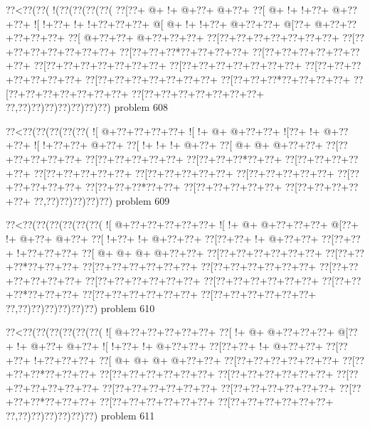 \vbox{\vbox{\goo
\0??<\0??(\0??(\- !(\0??(\0??(\0??(\0??(
\0??[\0??+\- @+\- !+\- @+\0??+\- @+\0??+
\0??[\- @+\- !+\- !+\0??+\- @+\0??+\0??+
\- ![\- !+\0??+\- !+\- !+\0??+\0??+\0??+
\- @[\- @+\- !+\- !+\0??+\- @+\0??+\0??+
\- @[\0??+\- @+\0??+\0??+\0??+\0??+\0??+
\0??[\- @+\0??+\0??+\- @+\0??+\0??+\0??+
\0??[\0??+\0??+\0??+\0??+\0??+\0??+\0??+
\0??[\0??+\0??+\0??+\0??+\0??+\0??+\0??+
\0??[\0??+\0??+\0??*\0??+\0??+\0??+\0??+
\0??[\0??+\0??+\0??+\0??+\0??+\0??+\0??+
\0??[\0??+\0??+\0??+\0??+\0??+\0??+\0??+
\0??[\0??+\0??+\0??+\0??+\0??+\0??+\0??+
\0??[\0??+\0??+\0??+\0??+\0??+\0??+\0??+
\0??[\0??+\0??+\0??+\0??+\0??+\0??+\0??+
\0??[\0??+\0??+\0??*\0??+\0??+\0??+\0??+
\0??[\0??+\0??+\0??+\0??+\0??+\0??+\0??+
\0??[\0??+\0??+\0??+\0??+\0??+\0??+\0??+
\0??,\0??)\0??)\0??)\0??)\0??)\0??)\0??)
}
\hfil problem 608\hfil\break
}

\vbox{\vbox{\goo
\0??<\0??(\0??(\0??(\0??(\0??(
\- ![\- @+\0??+\0??+\0??+\0??+
\- ![\- !+\- @+\- @+\0??+\0??+
\- ![\0??+\- !+\- @+\0??+\0??+
\- ![\- !+\0??+\0??+\- @+\0??+
\0??[\- !+\- !+\- !+\- @+\0??+
\0??[\- @+\- @+\- @+\0??+\0??+
\0??[\0??+\0??+\0??+\0??+\0??+
\0??[\0??+\0??+\0??+\0??+\0??+
\0??[\0??+\0??+\0??*\0??+\0??+
\0??[\0??+\0??+\0??+\0??+\0??+
\0??[\0??+\0??+\0??+\0??+\0??+
\0??[\0??+\0??+\0??+\0??+\0??+
\0??[\0??+\0??+\0??+\0??+\0??+
\0??[\0??+\0??+\0??+\0??+\0??+
\0??[\0??+\0??+\0??*\0??+\0??+
\0??[\0??+\0??+\0??+\0??+\0??+
\0??[\0??+\0??+\0??+\0??+\0??+
\0??,\0??)\0??)\0??)\0??)\0??)
}
\hfil problem 609\hfil\break
}

\vbox{\vbox{\goo
\0??<\0??(\0??(\0??(\0??(\0??(\0??(
\- ![\- @+\0??+\0??+\0??+\0??+\0??+
\- ![\- !+\- @+\- @+\0??+\0??+\0??+
\- @[\0??+\- !+\- @+\0??+\- @+\0??+
\0??[\- !+\0??+\- !+\- @+\0??+\0??+
\0??[\0??+\0??+\- !+\- @+\0??+\0??+
\0??[\0??+\0??+\- !+\0??+\0??+\0??+
\0??[\- @+\- @+\- @+\- @+\0??+\0??+
\0??[\0??+\0??+\0??+\0??+\0??+\0??+
\0??[\0??+\0??+\0??*\0??+\0??+\0??+
\0??[\0??+\0??+\0??+\0??+\0??+\0??+
\0??[\0??+\0??+\0??+\0??+\0??+\0??+
\0??[\0??+\0??+\0??+\0??+\0??+\0??+
\0??[\0??+\0??+\0??+\0??+\0??+\0??+
\0??[\0??+\0??+\0??+\0??+\0??+\0??+
\0??[\0??+\0??+\0??*\0??+\0??+\0??+
\0??[\0??+\0??+\0??+\0??+\0??+\0??+
\0??[\0??+\0??+\0??+\0??+\0??+\0??+
\0??,\0??)\0??)\0??)\0??)\0??)\0??)
}
\hfil problem 610\hfil\break
}

\vbox{\vbox{\goo
\0??<\0??(\0??(\0??(\0??(\0??(\0??(
\- ![\- @+\0??+\0??+\0??+\0??+\0??+
\0??[\- !+\- @+\- @+\0??+\0??+\0??+
\- @[\0??+\- !+\- @+\0??+\- @+\0??+
\- ![\- !+\0??+\- !+\- @+\0??+\0??+
\0??[\0??+\0??+\- !+\- @+\0??+\0??+
\0??[\0??+\0??+\- !+\0??+\0??+\0??+
\0??[\- @+\- @+\- @+\- @+\0??+\0??+
\0??[\0??+\0??+\0??+\0??+\0??+\0??+
\0??[\0??+\0??+\0??*\0??+\0??+\0??+
\0??[\0??+\0??+\0??+\0??+\0??+\0??+
\0??[\0??+\0??+\0??+\0??+\0??+\0??+
\0??[\0??+\0??+\0??+\0??+\0??+\0??+
\0??[\0??+\0??+\0??+\0??+\0??+\0??+
\0??[\0??+\0??+\0??+\0??+\0??+\0??+
\0??[\0??+\0??+\0??*\0??+\0??+\0??+
\0??[\0??+\0??+\0??+\0??+\0??+\0??+
\0??[\0??+\0??+\0??+\0??+\0??+\0??+
\0??,\0??)\0??)\0??)\0??)\0??)\0??)
}
\hfil problem 611\hfil\break
}

